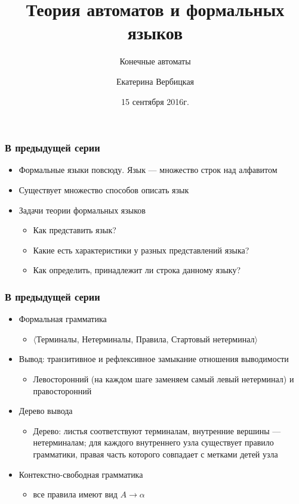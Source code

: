 \documentclass{beamer}
\title[]{Теория автоматов и формальных языков}
\subtitle[]{Конечные автоматы}
\institute[]{
Санкт-Петербургский государственный электротехнический университет <<ЛЭТИ>>\\
}
\author[]{Екатерина Вербицкая}
\date{15 сентября 2016г.}
\begin{document}
{
  \begin{frame}
    \titlepage
  \end{frame}
}

\begin{frame}[fragile]
  \transwipe[direction=90]
  \frametitle{В предыдущей серии}
  \begin{itemize}
    \item Формальные языки повсюду. Язык --- множество строк над алфавитом
    \item Существует множество способов описать язык
    \item Задачи теории формальных языков
    \begin{itemize}
      \item Как представить язык?
      \item Какие есть характеристики у разных представлений языка?
      \item Как определить, принадлежит ли строка данному языку?
    \end{itemize}
  \end{itemize}
\end{frame}

\begin{frame}[fragile]
  \transwipe[direction=90]
  \frametitle{В предыдущей серии}
  \begin{itemize}
    \item Формальная грамматика 
    \begin{itemize}
      \item $\langle$Терминалы, Нетерминалы, Правила, Стартовый нетерминал$\rangle$
    \end{itemize}
   \item Вывод: транзитивное и рефлексивное замыкание отношения выводимости
   \begin{itemize}
     \item Левосторонний (на каждом шаге заменяем самый левый нетерминал) и правосторонний
   \end{itemize}
   \item Дерево вывода
   \begin{itemize}
     \item Дерево: листья соответствуют терминалам, внутренние вершины --- нетерминалам; для каждого внутреннего узла существует правило грамматики, правая часть которого совпадает с метками детей узла
   \end{itemize}
    \item  Контекстно-свободная грамматика
      \begin{itemize}
        \item все правила имеют вид $A \rightarrow \alpha$
        
      \end{itemize}

      \end{itemize}

\end{frame}
\end{document}
